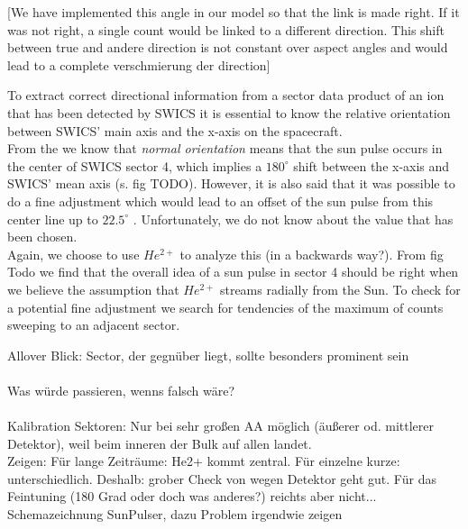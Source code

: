 [We have implemented this angle in our model so that the link is made right. If it was not right, a single count would be linked to a different direction. This shift between true and andere direction is not constant over aspect angles and would lead to a complete verschmierung der direction]


To extract correct directional information from a sector data product of an ion that has been detected by SWICS it is essential to know the relative orientation between SWICS' main axis and the x-axis on the spacecraft.\\
From the \citet[][S.20-22]{swics_dpu} we know that \textit{normal orientation} means that the sun pulse occurs in the center of SWICS sector 4, which implies a $180^\circ$ shift between the x-axis and SWICS' mean axis (s. fig TODO). However, it is also said that it was possible to do a fine adjustment which would lead to an offset of the sun pulse from this center line up to $22.5^\circ$ \citet[][S.48]{swics_dpu}. Unfortunately, we do not know about the value that has been chosen.
\\
Again, we choose to use $He^{2+}$ to analyze this (in a backwards way?). From fig Todo we find that the overall idea of a sun pulse in sector 4 should be right when we believe the assumption that $He^{2+}$ streams radially from the Sun. To check for a potential fine adjustment we search for tendencies of the maximum of counts sweeping to an adjacent sector.




Allover Blick: Sector, der gegnüber liegt, sollte besonders prominent sein
\\ \\
Was würde passieren, wenns falsch wäre?
\\ \\
Kalibration Sektoren: Nur bei sehr großen AA möglich (äußerer od. mittlerer Detektor), weil beim inneren der Bulk auf allen landet.
\\
Zeigen: Für lange Zeiträume: He2+ kommt zentral. Für einzelne kurze: unterschiedlich.
Deshalb: grober Check von wegen Detektor geht gut. Für das Feintuning (180 Grad oder doch was anderes?) reichts aber nicht...
\\
Schemazeichnung SunPulser, dazu Problem irgendwie zeigen

